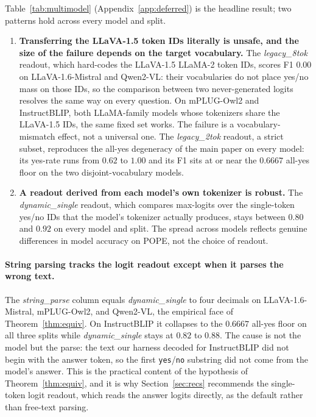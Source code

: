 \documentclass{article}
\begin{document}
Table~\ref{tab:multimodel} (Appendix~\ref{app:deferred}) is the headline
result; two patterns hold across every model and split.

\begin{enumerate}[leftmargin=*,nosep]
\item \textbf{Transferring the LLaVA-1.5 token IDs literally is unsafe,
and the size of the failure depends on the target vocabulary.} The
\emph{legacy\_8tok} readout, which hard-codes the LLaVA-1.5 LLaMA-2
token IDs, scores F1 $0.00$ on LLaVA-1.6-Mistral and Qwen2-VL: their
vocabularies do not place yes/no mass on those IDs, so the comparison
between two never-generated logits resolves the same way on every
question. On mPLUG-Owl2 and InstructBLIP, both LLaMA-family models
whose tokenizers share the LLaVA-1.5 IDs, the same fixed set works.
The failure is a vocabulary-mismatch effect, not a universal one.
The \emph{legacy\_2tok} readout, a strict subset, reproduces the
all-yes degeneracy of the main paper on every model: its yes-rate runs
from $0.62$ to $1.00$ and its F1 sits at or near the $0.6667$ all-yes
floor on the two disjoint-vocabulary models.
\item \textbf{A readout derived from each model's own tokenizer is
robust.} The \emph{dynamic\_single} readout, which compares max-logits
over the single-token yes/no IDs that the model's tokenizer actually
produces, stays between $0.80$ and $0.92$ on every model and split.
The spread across models reflects genuine differences in model accuracy
on POPE, not the choice of readout.
\end{enumerate}

\paragraph{String parsing tracks the logit readout except when it
parses the wrong text.} The \emph{string\_parse} column equals
\emph{dynamic\_single} to four decimals on LLaVA-1.6-Mistral,
mPLUG-Owl2, and Qwen2-VL, the empirical face of Theorem~\ref{thm:equiv}.
On InstructBLIP it collapses to the $0.6667$ all-yes floor on all three
splits while \emph{dynamic\_single} stays at $0.82$ to $0.88$. The cause
is not the model but the parse: the text our harness decoded for
InstructBLIP did not begin with the answer token, so the first
\texttt{yes}/\texttt{no} substring did not come from the model's answer.
This is the practical content of the hypothesis of
Theorem~\ref{thm:equiv}, and it is why Section~\ref{sec:recs} recommends
the single-token logit readout, which reads the answer logits directly,
as the default rather than free-text parsing.
\end{document}
